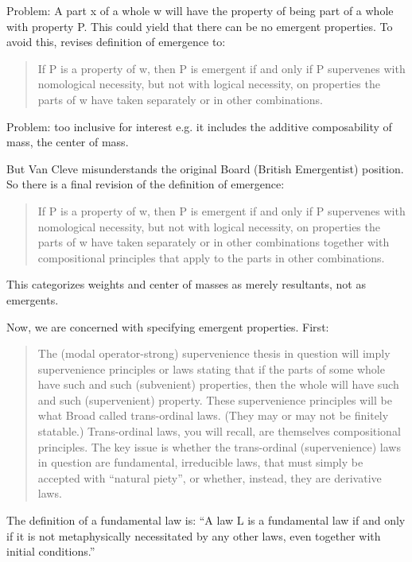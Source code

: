 \documentclass{article}
\begin{document}
Problem: A part x of a whole w will have the property of being part of a whole with property P. This could yield that there can be no emergent properties. To avoid this, revises definition of emergence to:

\begin{quote}
If P is a property of w, then P is emergent if and only if P supervenes with nomological necessity, but not with logical necessity, on properties the parts of w have taken separately or in other combinations.
\end{quote}

Problem: too inclusive for interest e.g. it includes the additive composability of mass, the center of mass.

But Van Cleve misunderstands the original Board (British Emergentist) position. So there is a final revision of the definition of emergence:

\begin{quote}
If P is a property of w, then P is emergent if and only if P supervenes with nomological necessity, but not with logical necessity, on properties the parts of w have taken separately or in other combinations together with compositional principles that apply to the parts in other combinations.
\end{quote}

This categorizes weights and center of masses as merely resultants, not as emergents.

Now, we are concerned with specifying emergent properties. First:

\begin{quote}
The (modal operator-strong) supervenience thesis in question will imply supervenience principles or laws stating that if the parts of some whole have such and such (subvenient) properties, then the whole will have such and such (supervenient) property. These supervenience principles will be what Broad called trans-ordinal laws. (They may or may not be finitely statable.) Trans-ordinal laws, you will recall, are themselves compositional principles. The key issue is whether the trans-ordinal (supervenience) laws in question are fundamental, irreducible laws, that must simply be accepted with ``natural piety'', or whether, instead, they are derivative laws.
\end{quote}

The definition of a fundamental law is: ``A law L is a fundamental law if and only if it is not metaphysically necessitated by any other laws, even together with initial conditions.''
\end{document}
